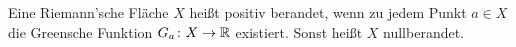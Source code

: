 \begin{frame}
    \begin{definition}
        Eine Riemann’sche Fläche $X$ heißt positiv berandet, wenn zu jedem Punkt $a \in X$ die Greensche Funktion $G_a \colon X \to \mathbb{R}$ existiert. 
        Sonst heißt $X$ nullberandet.
    \end{definition}
\end{frame}